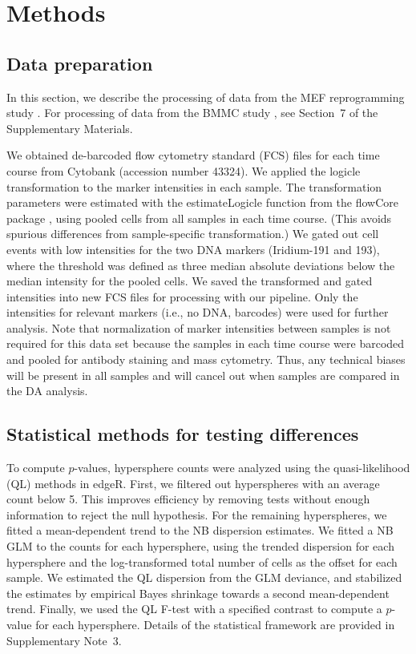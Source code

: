 \documentclass{article}
\newcommand{\suppsecedgeR}{3}
\newcommand{\suppsecbmmc}{7}
\begin{document}
\section{Methods}

\subsection{Data preparation}
In this section, we describe the processing of data from the MEF reprogramming study \cite{zunder2015continuous}.
For processing of data from the BMMC study \cite{levine2015datadriven}, see Section~\suppsecbmmc{} of the Supplementary Materials.

We obtained de-barcoded flow cytometry standard (FCS) files for each time course from Cytobank (accession number 43324).
We applied the logicle transformation \cite{parks2006new} to the marker intensities in each sample.
The transformation parameters were estimated with the estimateLogicle function from the flowCore package \cite{hahne2009flowcore}, using pooled cells from all samples in each time course.
(This avoids spurious differences from sample-specific transformation.)
We gated out cell events with low intensities for the two DNA markers (Iridium-191 and 193), where the threshold was defined as three median absolute deviations below the median intensity for the pooled cells.
We saved the transformed and gated intensities into new FCS files for processing with our pipeline.
Only the intensities for relevant markers (i.e., no DNA, barcodes) were used for further analysis.
Note that normalization of marker intensities between samples is not required for this data set because the samples in each time course were barcoded and pooled for antibody staining and mass cytometry.
Thus, any technical biases will be present in all samples and will cancel out when samples are compared in the DA analysis.

\subsection{Statistical methods for testing differences}
To compute $p$-values, hypersphere counts were analyzed using the quasi-likelihood (QL) methods in edgeR.
First, we filtered out hyperspheres with an average count below 5.
This improves efficiency by removing tests without enough information to reject the null hypothesis.
For the remaining hyperspheres, we fitted a mean-dependent trend to the NB dispersion estimates.
We fitted a NB GLM to the counts for each hypersphere, using the trended dispersion for each hypersphere and the log-transformed total number of cells as the offset for each sample.
We estimated the QL dispersion from the GLM deviance, and stabilized the estimates by empirical Bayes shrinkage towards a second mean-dependent trend.
Finally, we used the QL F-test with a specified contrast to compute a $p$-value for each hypersphere.
Details of the statistical framework are provided in Supplementary Note~\suppsecedgeR{}.
\end{document}
